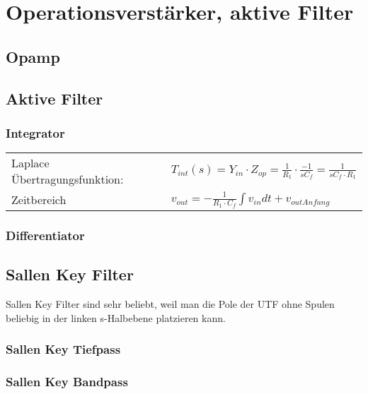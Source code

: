 \section{Operationsverstärker, aktive Filter}
\subsection{Opamp}

\subsection{Aktive Filter}
\subsubsection{Integrator}
\begin{tabular}{ll}
Laplace Übertragungsfunktion: & $T_{int}(s)=Y_{in}\cdot Z_{op}=\frac{1}{R_1}\cdot\frac{-1}{sC_{f}}=\frac{1}{sC_f\cdot R_1}$\\
Zeitbereich & $v_{out}=-\frac{1}{R_1\cdot C_f}\int v_{in}dt+v_{outAnfang}$\\
\end{tabular}
\subsubsection{Differentiator}
\subsection{Sallen Key Filter}
Sallen Key Filter sind sehr beliebt, weil man die Pole der UTF ohne Spulen beliebig in der linken s-Halbebene platzieren kann.
\subsubsection{Sallen Key Tiefpass}
\subsubsection{Sallen Key Bandpass}